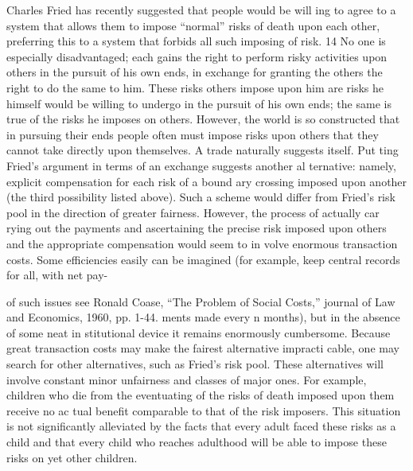 \documentclass[11pt,openany]{book}
\begin{document}
Charles Fried has recently suggested that people would be will ing to agree to a system that allows them to impose ``normal'' risks of death upon each other, preferring this to a system that forbids all such imposing of risk. 14 No one is especially disadvantaged; each gains the right to perform risky activities upon others in the pursuit of his own ends, in exchange for granting the others the right to do the same to him. These risks others impose upon him are risks he himself would be willing to undergo in the pursuit of his own ends; the same is true of the risks he imposes on others. However, the world is so constructed that in pursuing their ends people often must impose risks upon others that they cannot take directly upon themselves. A trade naturally suggests itself. Put ting Fried's argument in terms of an exchange suggests another al ternative: namely, explicit compensation for each risk of a bound ary crossing imposed upon another (the third possibility listed above). Such a scheme would differ from Fried's risk pool in the direction of greater fairness. However, the process of actually car rying out the payments and ascertaining the precise risk imposed upon others and the appropriate compensation would seem to in volve enormous transaction costs. Some efficiencies easily can be imagined (for example, keep central records for all, with net pay-

of such issues see Ronald Coase, ``The Problem of Social Costs,'' journal of Law and Economics, 1960, pp. 1-44. ments made every n months), but in the absence of some neat in stitutional device it remains enormously cumbersome. Because great transaction costs may make the fairest alternative impracti cable, one may search for other alternatives, such as Fried's risk pool. These alternatives will involve constant minor unfairness and classes of major ones. For example, children who die from the eventuating of the risks of death imposed upon them receive no ac tual benefit comparable to that of the risk imposers. This situation is not significantly alleviated by the facts that every adult faced these risks as a child and that every child who reaches adulthood will be able to impose these risks on yet other children. 
\end{document}
